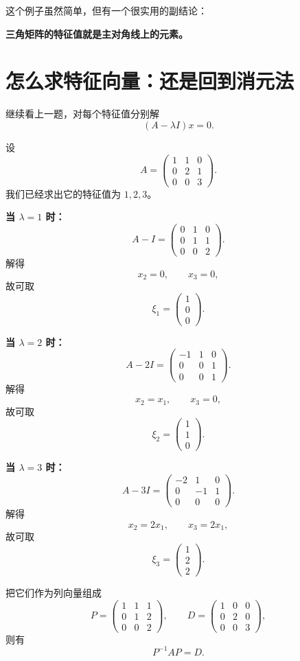 \documentclass[11pt,oneside,UTF8]{ctexbook}
\newcommand{\important}[1]{\textcolor{Sakura}{\textbf{#1}}}
\begin{document}
这个例子虽然简单，但有一个很实用的副结论：
\begin{center}
\important{三角矩阵的特征值就是主对角线上的元素。}
\end{center}

\section{怎么求特征向量：还是回到消元法}

继续看上一题，对每个特征值分别解
\[
(A-\lambda I)x=0.
\]

\begin{examplebox}[例 7：求特征向量并完成特征值分解]
设
\[
A=
\begin{pmatrix}
1&1&0\\
0&2&1\\
0&0&3
\end{pmatrix}.
\]
我们已经求出它的特征值为 \(1,2,3\)。

\textbf{当 \(\lambda=1\) 时：}
\[
A-I=
\begin{pmatrix}
0&1&0\\
0&1&1\\
0&0&2
\end{pmatrix}.
\]
解得
\[
x_2=0,\qquad x_3=0,
\]
故可取
\[
\xi_1=
\begin{pmatrix}
1\\0\\0
\end{pmatrix}.
\]

\textbf{当 \(\lambda=2\) 时：}
\[
A-2I=
\begin{pmatrix}
-1&1&0\\
0&0&1\\
0&0&1
\end{pmatrix}.
\]
解得
\[
x_2=x_1,\qquad x_3=0,
\]
故可取
\[
\xi_2=
\begin{pmatrix}
1\\1\\0
\end{pmatrix}.
\]

\textbf{当 \(\lambda=3\) 时：}
\[
A-3I=
\begin{pmatrix}
-2&1&0\\
0&-1&1\\
0&0&0
\end{pmatrix}.
\]
解得
\[
x_2=2x_1,\qquad x_3=2x_1,
\]
故可取
\[
\xi_3=
\begin{pmatrix}
1\\2\\2
\end{pmatrix}.
\]

把它们作为列向量组成
\[
P=
\begin{pmatrix}
1&1&1\\
0&1&2\\
0&0&2
\end{pmatrix},
\qquad
D=
\begin{pmatrix}
1&0&0\\
0&2&0\\
0&0&3
\end{pmatrix},
\]
则有
\[
P^{-1}AP=D.
\]
\end{examplebox}
\end{document}

